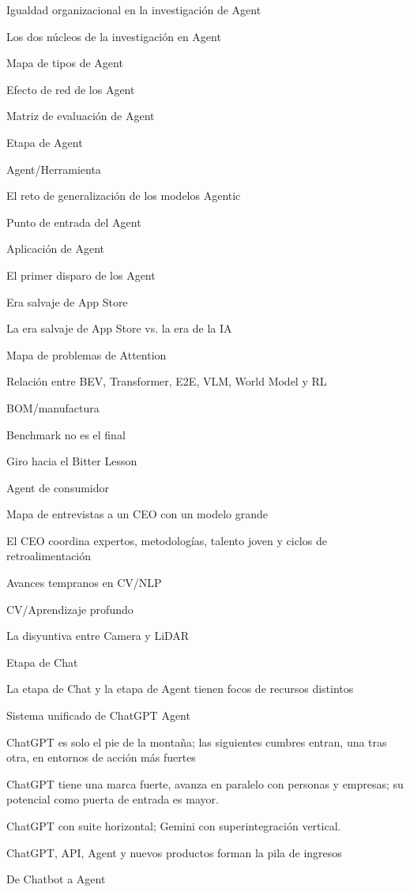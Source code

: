 \documentclass{article}
\begin{document}
Igualdad organizacional en la investigación de Agent

Los dos núcleos de la investigación en Agent

Mapa de tipos de Agent

Efecto de red de los Agent

Matriz de evaluación de Agent

Etapa de Agent

Agent/Herramienta

El reto de generalización de los modelos Agentic

Punto de entrada del Agent

Aplicación de Agent

El primer disparo de los Agent

Era salvaje de App Store

La era salvaje de App Store vs. la era de la IA

Mapa de problemas de Attention

Relación entre BEV, Transformer, E2E, VLM, World Model y RL

BOM/manufactura

Benchmark no es el final

Giro hacia el Bitter Lesson

Agent de consumidor

Mapa de entrevistas a un CEO con un modelo grande

El CEO coordina expertos, metodologías, talento joven y ciclos de retroalimentación

Avances tempranos en CV/NLP

CV/Aprendizaje profundo

La disyuntiva entre Camera y LiDAR

Etapa de Chat

La etapa de Chat y la etapa de Agent tienen focos de recursos distintos

Sistema unificado de ChatGPT Agent

ChatGPT es solo el pie de la montaña; las siguientes cumbres entran, una tras otra, en entornos de acción más fuertes

ChatGPT tiene una marca fuerte, avanza en paralelo con personas y empresas; su potencial como puerta de entrada es mayor.

ChatGPT con suite horizontal; Gemini con superintegración vertical.

ChatGPT, API, Agent y nuevos productos forman la pila de ingresos

De Chatbot a Agent
\end{document}
